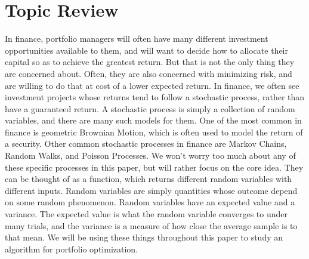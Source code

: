 \documentclass{article}
\begin{document}
\section{Topic Review}
In finance, portfolio managers will often have many different investment opportunities available to them, and will want to decide how to allocate their capital so as to achieve the greatest return.  But that is not the only thing they are concerned about.  Often, they are also concerned with minimizing risk, and are willing to do that at cost of a lower expected return. In finance, we often see investment projects whose returns tend to follow a stochastic process, rather than have a guaranteed return.  A stochastic process is simply a collection of random variables, and there are many such models for them.  One of the most common in finance is geometric Brownian Motion, which is often used to model the return of a security.  Other common stochastic processes in finance are Markov Chains, Random Walks, and Poisson Processes.  We won't worry too much about any of these specific processes in this paper, but will rather focus on the core idea.  They can be thought of as a function, which returns different random variables with different inputs.  Random variables are simply quantities whose outcome depend on some random phenomenon.  Random variables have an expected value and a variance.  The expected value is what the random variable converges to under many trials, and the variance is a measure of how close the average sample is to that mean.  We will be using these things throughout this paper to study an algorithm for portfolio optimization.  

\pagebreak
\end{document}
